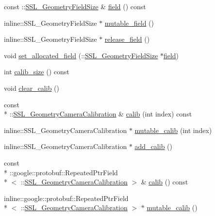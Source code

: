 \begin{DoxyCompactItemize}
\item 
const \-::\hyperlink{class_s_s_l___geometry_field_size}{S\-S\-L\-\_\-\-Geometry\-Field\-Size} \& \hyperlink{class_s_s_l___geometry_data_ab5200c00486fed8650b634368ed1b4fb}{field} () const 
\item 
inline\-::\-S\-S\-L\-\_\-\-Geometry\-Field\-Size $\ast$ \hyperlink{class_s_s_l___geometry_data_ad8eec0a6e81c392fbc1f0b3e7846f628}{mutable\-\_\-field} ()
\item 
inline\-::\-S\-S\-L\-\_\-\-Geometry\-Field\-Size $\ast$ \hyperlink{class_s_s_l___geometry_data_aed2d5499924b1727b55afb2dd44a03c3}{release\-\_\-field} ()
\item 
void \hyperlink{class_s_s_l___geometry_data_a2c0fdfee93a08a4c97311245b65b84d6}{set\-\_\-allocated\-\_\-field} (\-::\hyperlink{class_s_s_l___geometry_field_size}{S\-S\-L\-\_\-\-Geometry\-Field\-Size} $\ast$\hyperlink{class_s_s_l___geometry_data_ab5200c00486fed8650b634368ed1b4fb}{field})
\item 
int \hyperlink{class_s_s_l___geometry_data_a41dc4721770c53c990be6a03b51ba4ba}{calib\-\_\-size} () const 
\item 
void \hyperlink{class_s_s_l___geometry_data_abfe07b96e4a2cc69a2ab74f5b7dcae58}{clear\-\_\-calib} ()
\item 
const \\*
\-::\hyperlink{class_s_s_l___geometry_camera_calibration}{S\-S\-L\-\_\-\-Geometry\-Camera\-Calibration} \& \hyperlink{class_s_s_l___geometry_data_a8ec263de8c977af014d158e430e40112}{calib} (int index) const 
\item 
inline\-::\-S\-S\-L\-\_\-\-Geometry\-Camera\-Calibration $\ast$ \hyperlink{class_s_s_l___geometry_data_a4b4887bbac59acd600545bbb83606cbd}{mutable\-\_\-calib} (int index)
\item 
inline\-::\-S\-S\-L\-\_\-\-Geometry\-Camera\-Calibration $\ast$ \hyperlink{class_s_s_l___geometry_data_a0ba72df8f78064eaddc94acee9559c44}{add\-\_\-calib} ()
\item 
const \\*
\-::google\-::protobuf\-::\-Repeated\-Ptr\-Field\\*
$<$ \-::\hyperlink{class_s_s_l___geometry_camera_calibration}{S\-S\-L\-\_\-\-Geometry\-Camera\-Calibration} $>$ \& \hyperlink{class_s_s_l___geometry_data_a61aec9b4905591a734c702df1681841b}{calib} () const 
\item 
inline\-::google\-::protobuf\-::\-Repeated\-Ptr\-Field\\*
$<$ \-::\hyperlink{class_s_s_l___geometry_camera_calibration}{S\-S\-L\-\_\-\-Geometry\-Camera\-Calibration} $>$ $\ast$ \hyperlink{class_s_s_l___geometry_data_abfd8bcb6f3a0b77e1c8148a51f389097}{mutable\-\_\-calib} ()
\end{DoxyCompactItemize}

